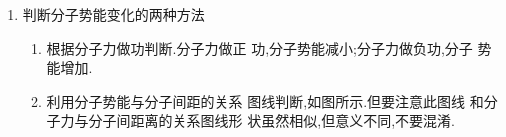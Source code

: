 \begin{enumerate}
\renewcommand{\labelenumi}{\arabic{enumi}.}
\item
判断分子势能变化的两种方法
\begin{enumerate}
\renewcommand{\labelenumii}{(\arabic{enumii})}

\item 
根据分子力做功判断.分子力做正
功,分子势能减小;分子力做负功,分子
势能增加.

\item 
利用分子势能与分子间距的关系
图线判断,如图所示.但要注意此图线
和分子力与分子间距离的关系图线形
状虽然相似,但意义不同,不要混淆.

\end{enumerate}



\end{enumerate}
